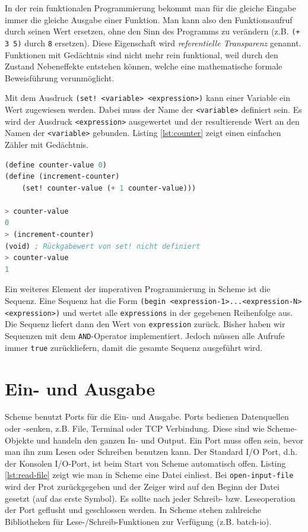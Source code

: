 In der rein funktionalen Programmierung bekommt man für die gleiche Eingabe immer die gleiche Ausgabe einer Funktion. Man kann also den Funktionsaufruf durch seinen Wert ersetzen, ohne den Sinn des Programms zu verändern (z.B. \verb|(+ 3 5)| durch \verb|8| ersetzen). Diese Eigenschaft wird \textit{referentielle Transparenz} genannt. Funktionen mit Gedächtnis sind nicht mehr rein funktional, weil durch den Zustand Nebeneffekte entstehen können, welche eine mathematische formale Beweisführung verunmöglicht.

Mit dem Ausdruck \verb|(set! <variable> <expression>)| kann einer Variable ein Wert zugewiesen werden. Dabei muss der Name der \verb|<variable>| definiert sein. Es wird der Ausdruck \verb|<expression>| ausgewertet und der resultierende Wert an den Namen der \verb|<variable>| gebunden. Listing \ref{lst:counter} zeigt einen einfachen Zähler mit Gedächtnis.

\begin{lstlisting}[language=Lisp, caption=Zähler mit Gedächtnis, label=lst:counter]
(define counter-value 0)
(define (increment-counter)
	(set! counter-value (+ 1 counter-value)))
	
> counter-value
0
> (increment-counter)
(void) ; Rückgabewert von set! nicht definiert
> counter-value
1
\end{lstlisting}

Ein weiteres Element der imperativen Programmierung in Scheme ist die Sequenz. Eine Sequenz hat die Form \verb|(begin <expression-1>...<expression-N> <expression>)| und wertet alle \verb|expressions| in der gegebenen Reihenfolge aus. Die Sequenz liefert dann den Wert von \verb|expression| zurück. Bisher haben wir Sequenzen mit dem \verb|AND|-Operator implementiert. Jedoch müssen alle Aufrufe immer \verb|true| zurückliefern, damit die gesamte Sequenz ausgeführt wird.

\section{Ein- und Ausgabe}

Scheme benutzt Ports für die Ein- und Ausgabe. Ports bedienen Datenquellen oder -senken, z.B. File, Terminal oder TCP Verbindung. Diese sind wie Scheme-Objekte und handeln den ganzen In- und Output. Ein Port muss offen sein, bevor man ihn zum Lesen oder Schreiben benutzen kann. Der Standard I/O Port, d.h. der Konsolen I/O-Port, ist beim Start von Scheme automatisch offen. Listing \ref{lst:read-file} zeigt wie man in Scheme eine Datei einliest. Bei \verb|open-input-file| wird der Prot zurückgegeben und der Zeiger wird auf den Beginn der Datei gesetzt (auf das erste Symbol). Es sollte nach jeder Schreib- bzw. Leseoperation der Port geflusht und geschlossen werden. In Scheme stehen zahlreiche Bibliotheken für Lese-/Schreib-Funktionen zur Verfügung (z.B. batch-io).

